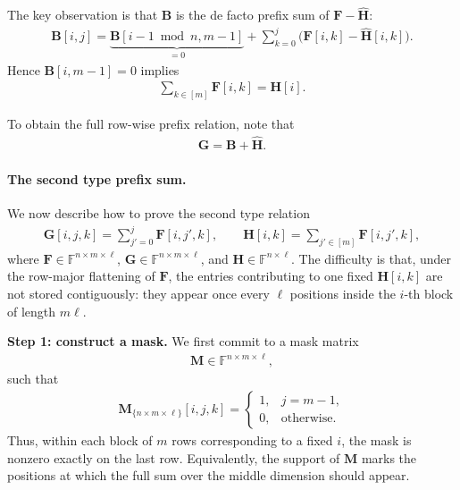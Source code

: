 The key observation is that $\mathbf{B}$ is the de facto prefix sum of
$\mathbf{F}-\widehat{\mathbf{H}}$:
\begin{align}
    \mathbf{B}[i,j]
    =
    \underbrace{\mathbf{B}[i-1\bmod n,m-1]}_{=0}
    +
    \sum_{k=0}^{j}\bigl(\mathbf{F}[i,k]-\widehat{\mathbf{H}}[i,k]\bigr).
\end{align}
Hence $\mathbf{B}[i,m-1]=0$ implies
\begin{align}
  \sum_{k\in[m]}\mathbf{F}[i,k]=\mathbf{H}[i].
\end{align}


To obtain the full row-wise prefix relation, note that
\begin{align}
  \mathbf{G} = \mathbf{B} + \widehat{\mathbf{H}}.
\end{align}

\paragraph{The second type prefix sum.}
We now describe how to prove the second type relation
\begin{align}
    \mathbf{G}[i,j,k]
    =
    \sum_{j'=0}^{j}\mathbf{F}[i,j',k],
    \qquad
    \mathbf{H}[i,k]
    =
    \sum_{j'\in[m]}\mathbf{F}[i,j',k],
\end{align}
where $\mathbf{F}\in\mathbb{F}^{n\times m\times \ell}$,
$\mathbf{G}\in\mathbb{F}^{n\times m\times \ell}$, and
$\mathbf{H}\in\mathbb{F}^{n\times \ell}$.
The difficulty is that, under the row-major flattening of
$\mathbf{F}$, the entries contributing to one fixed $\mathbf{H}[i,k]$ are not
stored contiguously: they appear once every $\ell$ positions inside the
$i$-th block of length $m\ell$.

\smallskip
\noindent
\textbf{Step 1: construct a mask.}
We first commit to a mask matrix
\begin{align}
    \mathbf{M}\in\mathbb{F}^{n\times m\times \ell},
\end{align}
such that
\begin{align}
    \mathbf{M}_{\{n\times m\times \ell\}}[i,j,k]
    =
    \begin{cases}
        1, & j=m-1,\\
        0, & \text{otherwise}.
    \end{cases}
\end{align}
Thus, within each block of $m$ rows corresponding to a fixed $i$, the mask is
nonzero exactly on the last row. Equivalently, the support of $\mathbf{M}$
marks the positions at which the full sum over the middle dimension should
appear.

